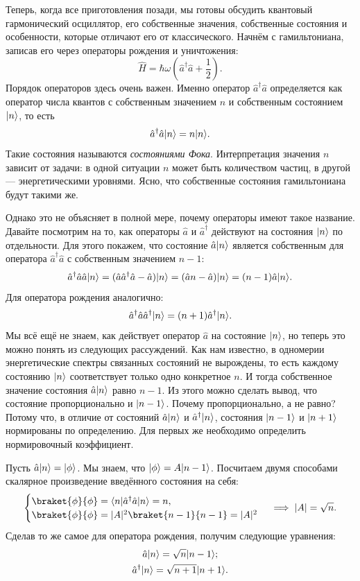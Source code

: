 Теперь, когда все приготовления позади, мы готовы обсудить квантовый
гармонический осциллятор, его собственные значения, собственные состояния и
особенности, которые отличают его от классического. Начнём с гамильтониана,
записав его через операторы рождения и уничтожения:
\[
  \hat{H} = \hbar\omega\left( \hat{a}^{\dagger}\hat{a} + \frac{1}{2}\right).
\]
Порядок операторов здесь очень важен. Именно оператор
$\hat{a}^{\dagger}\hat{a}$ определяется как оператор числа квантов с
собственным значением $n$ и собственным состоянием $\lvert n\rangle$, то есть
\[
  \hat{a}^{\dagger}\hat{a}\lvert n\rangle = n\lvert n\rangle.
\]
Такие состояния называются \textit{состояниями Фока}. Интерпретация значения
$n$ зависит от задачи: в одной ситуации $n$ может быть количеством частиц, в
другой --- энергетическими уровнями. Ясно, что собственные состояния
гамильтониана будут такими же.

Однако это не объясняет в полной мере, почему операторы имеют такое название.
Давайте посмотрим на то, как операторы $\hat{a}$ и $\hat{a}^{\dagger}$
действуют на состояния $\lvert n\rangle$ по отдельности. Для этого покажем, что
состояние $\hat{a}\lvert n\rangle$ является собственным для оператора
$\hat{a}^{\dagger}\hat{a}$ с собственным значением $n-1$:
\[
  \hat{a}^{\dagger}\hat{a}\hat{a}\lvert n\rangle = (\hat{a}\hat{a}^{\dagger}\hat{a} - \hat{a})\lvert n\rangle = (\hat{a}n - \hat{a})\lvert n\rangle = (n-1)\hat{a}\lvert n\rangle.
\]
Для оператора рождения аналогично:
\[
  \hat{a}^{\dagger}\hat{a}\hat{a}^{\dagger}\lvert n\rangle = (n+1)\hat{a}^{\dagger}\lvert n\rangle.
\]
Мы всё ещё не знаем, как действует оператор $\hat{a}$ на состояние $\lvert n\rangle$,
но теперь это можно понять из следующих рассуждений. Как нам известно, в
одномерии энергетические спектры связанных состояний не вырождены, то есть
каждому состоянию $\lvert n\rangle$ соответствует только одно конкретное $n$. И тогда
собственное значение состояния $\hat{a}\lvert n\rangle$ равно $n-1$. Из этого можно
сделать вывод, что состояние пропорционально и $\lvert n-1\rangle$. Почему
пропорционально, а не равно? Потому что, в отличие от состояний
$\hat{a}\lvert n\rangle$ и $\hat{a}^{\dagger}\lvert n\rangle$, состояния $\lvert n-1\rangle$ и
$\lvert n+1\rangle$ нормированы по определению. Для первых же необходимо определить
нормировочный коэффициент.

Пусть $\hat{a}\lvert n\rangle = \lvert\phi\rangle$. Мы знаем, что $\lvert\phi\rangle = A\lvert n-1\rangle$.
Посчитаем двумя способами скалярное произведение введённого состояния на себя:
\[
  \begin{cases}
    \braket{\phi}{\phi} = \bra{n}\hat{a}^{\dagger}\hat{a}\ket{n} = n,\\
    \braket{\phi}{\phi} = |A|^2\braket{n-1}{n-1} = |A|^2
  \end{cases}
  \implies |A| = \sqrt{n}.
\]
Сделав то же самое для оператора рождения, получим следующие уравнения:
\begin{gather*}
  \hat{a}\lvert n\rangle = \sqrt{n}\lvert n-1\rangle;\\
  \hat{a}^{\dagger}\lvert n\rangle = \sqrt{n+1}\lvert n+1\rangle.
\end{gather*}

